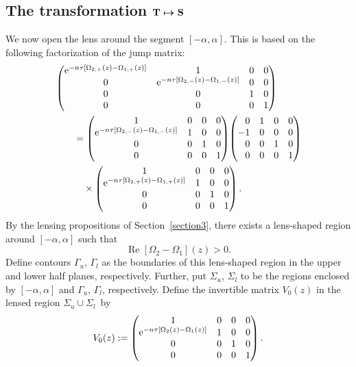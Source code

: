 \documentclass[10pt,a4paper]{amsart}
\numberwithin{equation}{section}
\begin{document}
\subsection[The transformation ${\bf T} \mapsto {\bf S}$]{The transformation $\boldsymbol{{\bf T} \mapsto {\bf S}}$}
We now open the lens around the segment $[-\alpha,\alpha]$. This is based on the following factorization of the jump matrix:
\begin{align*}
 &\begin{pmatrix}
 {\rm e}^{-n\tau[\Omega_{2,+}(z)-\Omega_{1,+}(z)]} & 1 & 0 & 0 \\
 0 & {\rm e}^{-n\tau[\Omega_{2,-}(z)-\Omega_{1,-}(z)]} & 0 & 0\\
 0 & 0 & 1 & 0 \\
 0 & 0 & 0 & 1
 \end{pmatrix}\\
 &\qquad{}=\begin{pmatrix}
 1 & 0 & 0 & 0\\
 {\rm e}^{-n\tau[\Omega_{2,-}(z)-\Omega_{1,-}(z)]} & 1 & 0 & 0\\
 0 & 0 & 1 & 0 \\
 0 & 0 & 0 & 1
 \end{pmatrix}\!
 \begin{pmatrix}
 \hphantom{-} 0 & 1 & 0 & 0\\
 -1 & 0 & 0 & 0\\
 \hphantom{-} 0 & 0 & 1 & 0 \\
 \hphantom{-} 0 & 0 & 0 & 1
 \end{pmatrix}\\
 & \qquad\quad\times
 \begin{pmatrix}
 1 & 0 & 0 & 0\\
 {\rm e}^{-n\tau[\Omega_{2,+}(z)-\Omega_{1,+}(z)]} & 1 & 0 & 0\\
 0 & 0 & 1 & 0 \\
 0 & 0 & 0 & 1
 \end{pmatrix}.
\end{align*}
By the lensing propositions of Section~\ref{section3}, there exists a lens-shaped region around $[-\alpha,\alpha]$ such that \[
\operatorname{Re}[\Omega_2 -\Omega_1](z) >0.
\]
 Define contours $\Gamma_u$, $\Gamma_l$ as the boundaries of this lens-shaped region in the upper and lower half planes, respectively. Further, put $\Sigma_u$, $\Sigma_l$ to be the regions enclosed by $[-\alpha,\alpha]$ and $\Gamma_u$, $\Gamma_l$, respectively.
Define the invertible matrix $V_0(z)$ in the lensed region $\Sigma_u \cup \Sigma_l$~by
 \begin{equation*}
 V_0(z) := \begin{pmatrix}
 1 & 0 & 0 & 0\\
 {\rm e}^{-n\tau[\Omega_{2}(z)-\Omega_{1}(z)]} & 1 & 0 & 0\\
 0 & 0 & 1 & 0 \\
 0 & 0 & 0 & 1
 \end{pmatrix}.
 \end{equation*}
\end{document}
